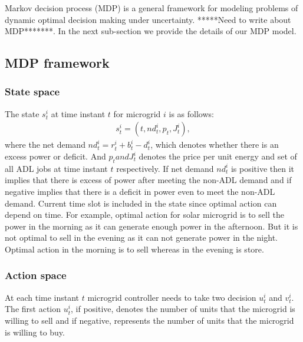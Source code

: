Markov decision process (MDP)  is a general framework for modeling problems of dynamic optimal decision making under uncertainty. *****Need to write about MDP*******.
 In the next sub-section we provide the details of our MDP model.
\subsection{MDP framework}
\subsubsection{State space}
The state $s_{t}^{i}$ at time instant $t$  for microgrid $i$ is as follows:
\begin{align}
s_{t}^{i} = (t,nd_{t}^{i},p_{t}, J_{t}^{i}),
\end{align}
where the net demand $nd_{t}^{i} = r_{t}^{i} + b_{t}^{i} - d_{t}^{i}$, which denotes whether there is an excess power or deficit.  And $p_{t} and  J_{t}^{i}$ denotes the price per unit energy and set of all ADL jobs at time instant $t$ respectively. If  net demand $nd_{t}^{i}$ is positive then it implies that there is excess of power after meeting the non-ADL demand and if negative implies that there is a deficit in power even to meet the non-ADL demand. Current time slot is  included in the state since optimal action can depend on time. For example, optimal action for solar microgrid  is to sell the power in the morning as it can generate enough power in the afternoon. But it is not optimal to sell in the evening as it can not generate power in the night. Optimal action in the morning is to sell whereas in the evening is store.
\subsubsection{Action space}
At each time instant $t$ microgrid controller needs to take two decision $u_{t}^{i}$ and $v_{t}^{i}$. The first action $u_{t}^{i}$, if positive, denotes the number of units that the microgrid is willing to sell and if negative, represents the number of units that the microgrid is willing to buy. 


